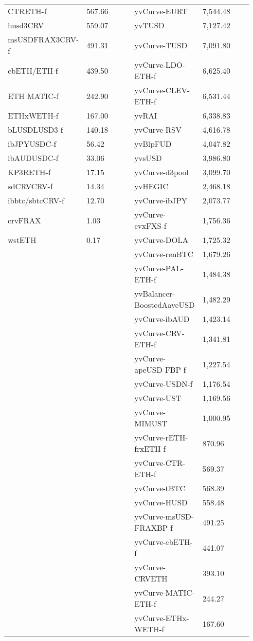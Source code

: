 \begin{longtable}{@{}p{0.25\linewidth}p{0.25\linewidth}p{0.25\linewidth}p{0.25\linewidth}@{}}
CTRETH-f & 567.66 & yvCurve-EURT & 7,544.48 \\
husd3CRV & 559.07 & yvTUSD & 7,127.42 \\
msUSDFRAX3CRV-f & 491.31 & yvCurve-TUSD & 7,091.80 \\
cbETH/ETH-f & 439.50 & yvCurve-LDO-ETH-f & 6,625.40 \\
ETH MATIC-f & 242.90 & yvCurve-CLEV-ETH-f & 6,531.44 \\
ETHxWETH-f & 167.00 & yvRAI & 6,338.83 \\
bLUSDLUSD3-f & 140.18 & yvCurve-RSV & 4,616.78 \\
ibJPYUSDC-f & 56.42 & yvBlpFUD & 4,047.82 \\
ibAUDUSDC-f & 33.06 & yvsUSD & 3,986.80 \\
KP3RETH-f & 17.15 & yvCurve-d3pool & 3,099.70 \\
sdCRVCRV-f & 14.34 & yvHEGIC & 2,468.18 \\
ibbtc/sbtcCRV-f & 12.70 & yvCurve-ibJPY & 2,073.77 \\
crvFRAX & 1.03 & yvCurve-cvxFXS-f & 1,756.36 \\
wstETH & 0.17 & yvCurve-DOLA & 1,725.32 \\
 &  & yvCurve-renBTC & 1,679.26 \\
 &  & yvCurve-PAL-ETH-f & 1,484.38 \\
 &  & yvBalancer-BoostedAaveUSD & 1,482.29 \\
 &  & yvCurve-ibAUD & 1,423.14 \\
 &  & yvCurve-CRV-ETH-f & 1,341.81 \\
 &  & yvCurve-apeUSD-FBP-f & 1,227.54 \\
 &  & yvCurve-USDN-f & 1,176.54 \\
 &  & yvCurve-UST & 1,169.56 \\
 &  & yvCurve-MIMUST & 1,000.95 \\
 &  & yvCurve-rETH-frxETH-f & 870.96 \\
 &  & yvCurve-CTR-ETH-f & 569.37 \\
 &  & yvCurve-tBTC & 568.39 \\
 &  & yvCurve-HUSD & 558.48 \\
 &  & yvCurve-msUSD-FRAXBP-f & 491.25 \\
 &  & yvCurve-cbETH-f & 441.07 \\
 &  & yvCurve-CRVETH & 393.10 \\
 &  & yvCurve-MATIC-ETH-f & 244.27 \\
 &  & yvCurve-ETHx-WETH-f & 167.60 \\

\end{longtable}
